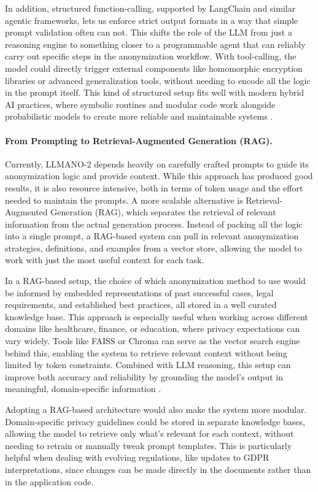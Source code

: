 \documentclass{article}
\begin{document}
In addition, structured function-calling, supported by LangChain and similar agentic frameworks, lets us enforce strict output formats in a way that simple prompt validation often can not. This shifts the role of the LLM from just a reasoning engine to something closer to a programmable agent that can reliably carry out specific steps in the anonymization workflow. With tool-calling, the model could directly trigger external components like homomorphic encryption libraries or advanced generalization tools, without needing to encode all the logic in the prompt itself. This kind of structured setup fits well with modern hybrid AI practices, where symbolic routines and modular code work alongside probabilistic models to create more reliable and maintainable systems \cite{jarvix}.

\paragraph{From Prompting to Retrieval-Augmented Generation (RAG).}
Currently, LLMANO-2 depends heavily on carefully crafted prompts to guide its anonymization logic and provide context. While this approach has produced good results, it is also resource intensive, both in terms of token usage and the effort needed to maintain the prompts. A more scalable alternative is Retrieval-Augmented Generation (RAG), which separates the retrieval of relevant information from the actual generation process. Instead of packing all the logic into a single prompt, a RAG-based system can pull in relevant anonymization strategies, definitions, and examples from a vector store, allowing the model to work with just the most useful context for each task.

In a RAG-based setup, the choice of which anonymization method to use would be informed by embedded representations of past successful cases, legal requirements, and established best practices, all stored in a well curated knowledge base. This approach is especially useful when working across different domains like healthcare, finance, or education, where privacy expectations can vary widely. Tools like FAISS \cite{faiss2023} or Chroma can serve as the vector search engine behind this, enabling the system to retrieve relevant context without being limited by token constraints. Combined with LLM reasoning, this setup can improve both accuracy and reliability by grounding the model’s output in meaningful, domain-specific information \cite{llm_content_analysis}.

Adopting a RAG-based architecture would also make the system more modular. Domain-specific privacy guidelines could be stored in separate knowledge bases, allowing the model to retrieve only what’s relevant for each context, without needing to retrain or manually tweak prompt templates. This is particularly helpful when dealing with evolving regulations, like updates to GDPR interpretations, since changes can be made directly in the documents rather than in the application code.
\end{document}
